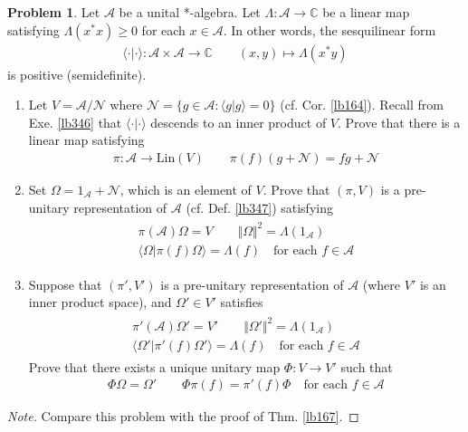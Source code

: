 \documentclass[12pt,b5paper,notitlepage]{article}
\theoremstyle{definition}
\newtheorem{prob}{\color{red}Problem}[section]
\theoremstyle{plain}
\newcommand{\bk}[1]{\langle {#1}\rangle}
\newcommand{\scr}{\mathscr}
\newcommand{\Cbb}{\mathbb C}
\newcommand{\Lin}{\mathrm{Lin}}
\newcommand{\SA}{\mathscr A}
\numberwithin{equation}{section}
\begin{document}
\begin{prob}\label{lb348}
Let $\SA$ be a unital *-algebra. Let $\Lambda:\SA\rightarrow\Cbb$ be a linear map satisfying $\Lambda(x^*x)\geq0$ for each $x\in\SA$. In other words, the sesquilinear form
\begin{gather}\label{eq182}
\bk{\cdot|\cdot}:\SA\times\SA\rightarrow\Cbb\qquad (x,y)\mapsto \Lambda(x^*y)
\end{gather}
is positive (semidefinite).
\begin{enumerate}
\item Let $V=\SA/\scr N$ where $\scr N=\{g\in\SA:\bk{g|g}=0\}$ (cf. Cor. \ref{lb164}). Recall from Exe. \ref{lb346} that $\bk{\cdot|\cdot}$ descends to an inner product of $V$. Prove that there is a linear map satisfying
\begin{align*}
\pi:\SA\rightarrow\Lin(V)\qquad \pi(f)(g+\scr N)=fg+\scr N
\end{align*}
\item Set $\Omega=1_{\scr A}+\scr N$, which is an element of $V$. Prove that $(\pi,V)$ is a pre-unitary representation of $\SA$ (cf. Def. \ref{lb347}) satisfying 
\begin{gather}
\begin{gathered}
\pi(\SA)\Omega=V\qquad \Vert\Omega\Vert^2=\Lambda(1_\SA)\\
\bk{\Omega|\pi(f)\Omega}=\Lambda(f)\quad\text{for each }f\in\SA
\end{gathered}
\end{gather}
\item Suppose that $(\pi',V')$ is a pre-unitary representation of $\SA$ (where $V'$ is an inner product space), and $\Omega'\in V'$ satisfies
\begin{gather}
\begin{gathered}
\pi'(\SA)\Omega'=V'\qquad \Vert\Omega'\Vert^2=\Lambda(1_\SA)\\
\bk{\Omega'|\pi'(f)\Omega'}=\Lambda(f)\quad\text{for each }f\in\SA
\end{gathered}
\end{gather}
Prove that there exists a unique unitary map $\Phi:V\rightarrow V'$ such that
\begin{gather*}
\Phi\Omega=\Omega'\qquad \Phi\pi(f)=\pi'(f)\Phi\quad\text{for each }f\in\SA
\end{gather*}
\end{enumerate}
\end{prob}

\begin{proof}[Note]
Compare this problem with the proof of Thm. \ref{lb167}.
\end{proof}
\end{document}

